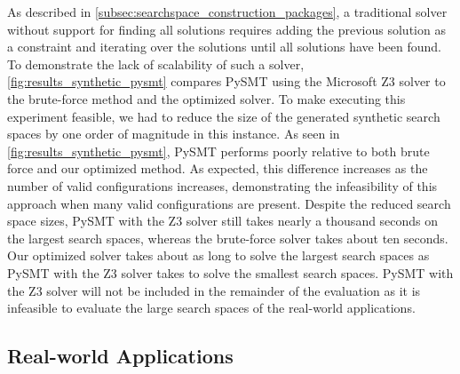 As described in \cref{subsec:searchspace_construction_packages}, a traditional solver without support for finding all solutions requires adding the previous solution as a constraint and iterating over the solutions until all solutions have been found. To demonstrate the lack of scalability of such a solver, \cref{fig:results_synthetic_pysmt} compares PySMT using the Microsoft Z3 solver to the brute-force method and the optimized solver. 
To make executing this experiment feasible, we had to reduce the size of the generated synthetic search spaces by one order of magnitude in this instance. 
As seen in \cref{fig:results_synthetic_pysmt}, PySMT performs poorly relative to both brute force and our optimized method. As expected, this difference increases as the number of valid configurations increases, demonstrating the infeasibility of this approach when many valid configurations are present. 
Despite the reduced search space sizes, PySMT with the Z3 solver still takes nearly a thousand seconds on the largest search spaces, whereas the brute-force solver takes about ten seconds. 
Our optimized solver takes about as long to solve the largest search spaces as PySMT with the Z3 solver takes to solve the smallest search spaces. PySMT with the Z3 solver will not be included in the remainder of the evaluation as it is infeasible to evaluate the large search spaces of the real-world applications. 




\subsection{Real-world Applications} \label{subsec:evaluation_real-world}

